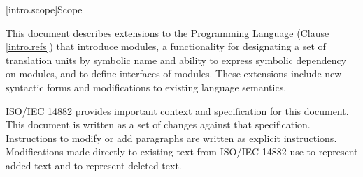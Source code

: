 \setcounter{chapter}{0}
[intro.scope]{Scope}

\pnum
This document describes extensions to the \Cpp
Programming Language (Clause \ref{intro.refs}) that introduce modules,
a functionality for designating a set of translation units by symbolic
name and ability to express symbolic dependency on modules, and to
define interfaces of modules.  These extensions include 
new syntactic forms and modifications to existing language semantics.

\pnum
ISO/IEC 14882 provides important context
and specification for this document. This document is 
written as a set of changes against that specification. Instructions
to modify or add paragraphs are written as explicit instructions. 
Modifications made directly to existing text from ISO/IEC 14882 use  to represent added text and
 to represent deleted text.

